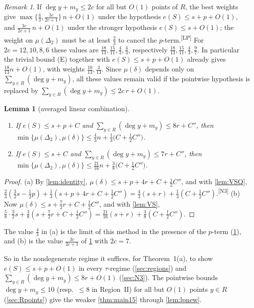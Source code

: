 \documentclass[11pt]{amsart}
\newtheorem{lemma}[theorem]{Lemma}
\theoremstyle{definition}
\theoremstyle{remark}
\newtheorem{remark}[theorem]{Remark}
\newcommand{\Dt}{\Delta_2}
\newcommand{\mult}{\mu}
\newcommand{\chk}[1]{\textsuperscript{[#1]}}
\begin{document}
\begin{remark}\label{rem:lpvalues}
If $\deg y+m_y\le 2c$ for all but $O(1)$ points of $R$, the best weights give $\max\{\frac43,\frac{3c}{2c+1}\}\,n+O(1)$ under the hypothesis $e(S)\le s+p+O(1)$, and $\frac{3c}{2c+1}\,n+O(1)$ under the stronger hypothesis $e(S)\le s+O(1)$; the weight on $\mult(\Dt)$ must be at least $\frac23$ to cancel the $p$-term.\chk{LP} For $2c=12,10,8,6$ these values are $\frac{18}{13},\frac{15}{11},\frac43,\frac43$, respectively $\frac{18}{13},\frac{15}{11},\frac43,\frac97$. In particular the trivial bound (E) together with $e(S)\le s+p+O(1)$ already gives $\frac{18}{13}n+O(1)$, with weights $\frac{10}{13},\frac3{13}$. Since $\mult(\delta)$ depends only on $\sum_{y\in R}(\deg y+m_y)$, all these values remain valid if the pointwise hypothesis is replaced by $\sum_{y\in R}(\deg y+m_y)\le 2c\,r+O(1)$.
\end{remark}

\begin{lemma}[averaged linear combination]\label{lem:lpavg}
\begin{enumerate}[label=\textup{(\alph*)}]
\item If $e(S)\le s+p+C$ and $\sum_{y\in R}(\deg y+m_y)\le 8r+C''$, then $\min\{\mult(\Dt),\mult(\delta)\}\le\frac43n+\frac13\bigl(C+\frac12C''\bigr)$.
\item If $e(S)\le s+C$ and $\sum_{y\in R}(\deg y+m_y)\le 7r+C''$, then $\min\{\mult(\Dt),\mult(\delta)\}\le\frac{21}{16}n+\frac38\bigl(C+\frac12C''\bigr)$.
\end{enumerate}
\end{lemma}
\begin{proof}
(a) By \cref{lem:identity}, $\mult(\delta)\le s+p+4r+C+\frac12C''$, and with \cref{lem:VSQ}, $\frac23(\frac32s-\frac12p)+\frac13(s+p+4r+C+\frac12C'')=\frac43(s+r)+\frac13(C+\frac12C'')$.\chk{N3} (b) Now $\mult(\delta)\le s+\frac72r+C+\frac12C''$, and with \cref{lem:VS}, $\frac58\cdot\frac32s+\frac38(s+\frac72r+C+\frac12C'')=\frac{21}{16}(s+r)+\frac38(C+\frac12C'')$.
\end{proof}
The value $\frac43$ in (a) is the limit of this method in the presence of the $p$-term (\cref{rem:lpvalues}), and (b) is the value $\frac{3c}{2c+1}$ of \cref{rem:lpvalues} with $2c=7$.

So in the nondegenerate regime it suffices, for Theorem~1(a), to show $e(S)\le s+p+O(1)$ in every $\tau$-regime (\cref{sec:regions}) and $\sum_{y\in R}(\deg y+m_y)\le 8r+O(1)$ (\cref{sec:N3}). The pointwise bounds $\deg y+m_y\le 10$ (resp.\ $\le 8$ in Region~II) for all but $O(1)$ points $y\in R$ (\cref{sec:Rpoints}) give the weaker \cref{thm:main15} through \cref{lem:lpnew}.
\end{document}
